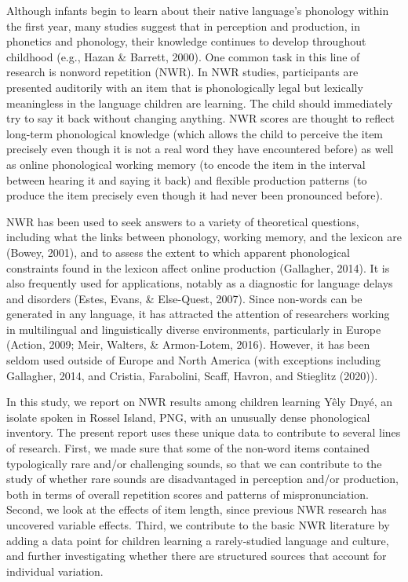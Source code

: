 \documentclass[english,,man,floatsintext]{apa6}
\begin{document}
Although infants begin to learn about their native language's phonology
within the first year, many studies suggest that in perception and
production, in phonetics and phonology, their knowledge continues to
develop throughout childhood (e.g., Hazan \& Barrett, 2000). One common
task in this line of research is nonword repetition (NWR). In NWR
studies, participants are presented auditorily with an item that is
phonologically legal but lexically meaningless in the language children
are learning. The child should immediately try to say it back without
changing anything. NWR scores are thought to reflect long-term
phonological knowledge (which allows the child to perceive the item
precisely even though it is not a real word they have encountered
before) as well as online phonological working memory (to encode the
item in the interval between hearing it and saying it back) and flexible
production patterns (to produce the item precisely even though it had
never been pronounced before).

NWR has been used to seek answers to a variety of theoretical questions,
including what the links between phonology, working memory, and the
lexicon are (Bowey, 2001), and to assess the extent to which apparent
phonological constraints found in the lexicon affect online production
(Gallagher, 2014). It is also frequently used for applications, notably
as a diagnostic for language delays and disorders (Estes, Evans, \&
Else-Quest, 2007). Since non-words can be generated in any language, it
has attracted the attention of researchers working in multilingual and
linguistically diverse environments, particularly in Europe (Action,
2009; Meir, Walters, \& Armon-Lotem, 2016). However, it has been seldom
used outside of Europe and North America (with exceptions including
Gallagher, 2014, and Cristia, Farabolini, Scaff, Havron, and Stieglitz
(2020)).

In this study, we report on NWR results among children learning Yêly
Dnyé, an isolate spoken in Rossel Island, PNG, with an unusually dense
phonological inventory. The present report uses these unique data to
contribute to several lines of research. First, we made sure that some
of the non-word items contained typologically rare and/or challenging
sounds, so that we can contribute to the study of whether rare sounds
are disadvantaged in perception and/or production, both in terms of
overall repetition scores and patterns of mispronunciation. Second, we
look at the effects of item length, since previous NWR research has
uncovered variable effects. Third, we contribute to the basic NWR
literature by adding a data point for children learning a rarely-studied
language and culture, and further investigating whether there are
structured sources that account for individual variation.
\end{document}

